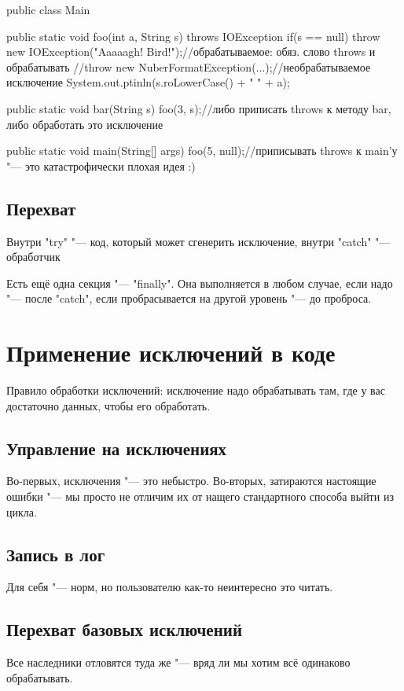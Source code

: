 \begin{javacode}
public class Main {
	
	public static void foo(int a, String s) throws IOException {
		if(s == null) {
			throw new IOException("Aaaaagh! Bird!");//обрабатываемое: обяз. слово throws и обрабатывать
			//throw new NuberFormatException(...);//необрабатываемое исключение
		}	
		System.out.ptinln(s.roLowerCase() + " " + a);
	}

	public static void bar(String s) {
		foo(3, s);//либо приписать throws к методу bar, либо обработать это исключение
	}
	
	public static void main(String[] args) {
		foo(5, null);//приписывать throws к main'у "--- это катастрофически плохая идея :)
	}
}
\end{javacode}

\subsection{Перехват}
Внутри \java"try" "--- код, который может сгенерить исключение, внутри \java"catch" "--- обработчик

Есть ещё одна секция "--- \java"finally". Она выполняется в любом случае, если надо "--- после \java"catch", если пробрасывается
на другой уровень "--- до проброса.


\section{Применение исключений в коде}
Правило обработки исключений:
исключение надо обрабатывать там, где у вас достаточно данных, чтобы его обработать.

\subsection{Управление на исключениях}
Во-первых, исключения "--- это небыстро.
Во-вторых, затираются настоящие ошибки "--- мы просто не отличим их от нащего стандартного способа выйти из цикла.

\subsection{Запись в лог}
Для себя "--- норм, но пользователю как-то неинтересно это читать.

\subsection{Перехват базовых исключений}
Все наследники отловятся туда же "--- вряд ли мы хотим всё одинаково обрабатывать.

